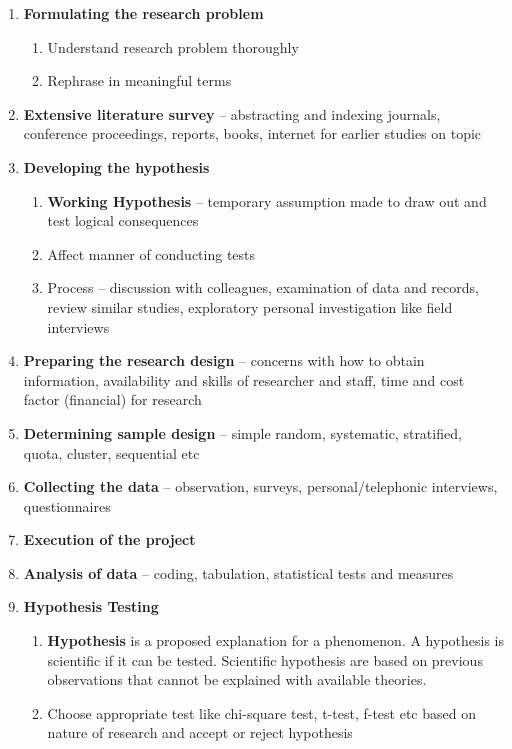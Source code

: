\documentclass{article}
\begin{document}
\begin{enumerate}

    \item \textbf{Formulating the research problem}
        \begin{enumerate}
            \item Understand research problem thoroughly
            \item Rephrase in meaningful terms
        \end{enumerate}
        
    \item \textbf{Extensive literature survey} -- abstracting and indexing journals, conference proceedings, reports, books, internet for earlier studies on topic
    
    \item \textbf{Developing the hypothesis}
        \begin{enumerate}
            \item \textbf{Working Hypothesis} -- temporary assumption made to draw out and test logical consequences
            \item Affect manner of conducting tests
            \item Process -- discussion with colleagues, examination of data and records, review similar studies, exploratory personal investigation like field interviews
        \end{enumerate}
    
    \item \textbf{Preparing the research design} -- concerns with how to obtain information, availability and skills of researcher and staff, time and cost factor (financial) for research

    \item \textbf{Determining sample design} -- simple random, systematic, stratified, quota, cluster, sequential etc
    
    \item \textbf{Collecting the data} -- observation, surveys, personal/telephonic interviews, questionnaires
    
    \item \textbf{Execution of the project}
    
    \item \textbf{Analysis of data} -- coding, tabulation, statistical tests and measures
    
    \item \textbf{Hypothesis Testing}
        \begin{enumerate}
            \item \textbf{Hypothesis} is a proposed explanation for a phenomenon. A hypothesis is scientific if it can be tested. Scientific hypothesis are based on previous observations that cannot be explained with available theories.
            \item Choose appropriate test like chi-square test, t-test, f-test etc based on nature of research and accept or reject hypothesis
        \end{enumerate}
    

\end{enumerate}
\end{document}
